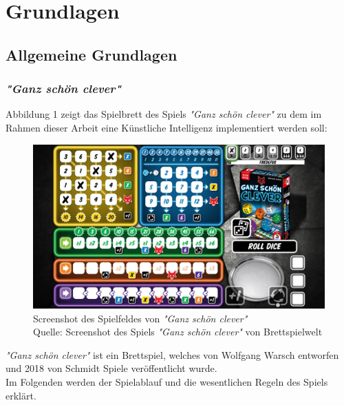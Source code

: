 \section{Grundlagen}
\subsection{Allgemeine Grundlagen}
\subsubsection{\textit{"Ganz schön clever"}}
	Abbildung 1 zeigt das Spielbrett des Spiels \textit{"Ganz schön clever"} zu dem im Rahmen dieser Arbeit eine Künstliche Intelligenz implementiert werden soll:
	\nopagebreak
\begin{figure}[H]
	\includegraphics[width=1\textwidth]{Bilder/gsc} 
	\caption[\textit{Screenshot des Spielfeldes von \textit{"Ganz schön clever"}}]{Screenshot des Spielfeldes von \textit{"Ganz schön clever"}\\ Quelle: Screenshot des Spiels \textit{"Ganz schön clever"} von Brettspielwelt}
\end{figure}

\textit{"Ganz schön clever"} ist ein Brettspiel, welches von Wolfgang Warsch entworfen und 2018 von Schmidt Spiele veröffentlicht wurde.\\

Im Folgenden werden der Spielablauf und die wesentlichen Regeln des Spiels erklärt.

